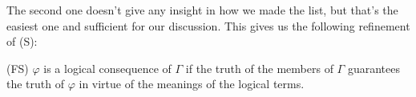 \documentclass[a4paper]{article}
\begin{document}
The second one doesn't give any insight in how we made the list, but that's
the easiest one and sufficient for our discussion.  This gives us the following
refinement of (S):

(FS) $\varphi$ is a logical consequence of $\Gamma$ if the truth of the members
of $\Gamma$ guarantees the truth of $\varphi$ in virtue of the meanings of the
logical terms.




\end{document}
